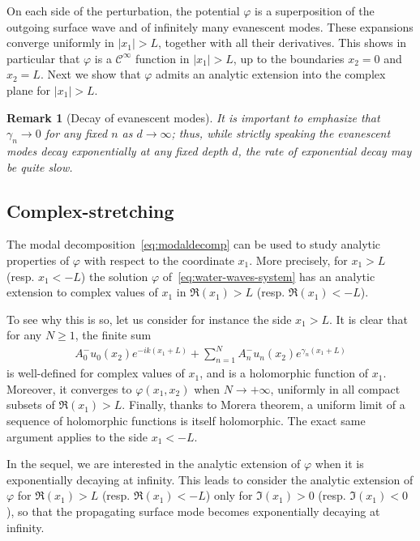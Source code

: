 \documentclass[11pt]{article}
\newtheorem{remark}[theorem]{Remark}
\begin{document}
On each side of the perturbation, the potential $\varphi$ is a superposition of
the outgoing surface wave and of infinitely many evanescent modes. These
expansions converge uniformly in $|x_1|>L$, together with all their derivatives.
This shows in particular that $\varphi$ is a $\mathcal{C}^\infty$ function in
$|x_1|>L$, up to the boundaries $x_2=0$ and $x_2=L$. Next we show that $\varphi$
admits an analytic extension into the complex plane for $|x_1|>L$.

\begin{remark}[Decay of evanescent modes]
  It is important to emphasize that $\gamma_n \to 0$ for any fixed $n$ as $d \to
  \infty$; thus, while strictly speaking the evanescent modes decay
  exponentially at any fixed depth $d$, the rate of exponential decay may be
  quite slow. 
\end{remark}

\subsection{Complex-stretching}\label{sec:complex-stretching}

The modal decomposition~\cref{eq:modaldecomp} can be used to study analytic
properties of $\varphi$ with respect to the coordinate $x_1$. More precisely,
for $x_1>L$ (resp. $x_1<-L$) the solution $\varphi$
of~\cref{eq:water-waves-system} has an analytic extension to complex values of
$x_1$ in $\Re(x_1)>L$ (resp. $\Re(x_1)<-L$). 

To see why this is so, let us consider for instance the side $x_1>L$. It is
clear that for any $N \geq 1$, the finite sum
\begin{align}
  A_0^-u_0(x_2)e^{-ik(x_1+L)}+\sum_{n= 1}^NA_n^-u_n(x_2)e^{\gamma_n(x_1+L)}
\end{align}
is well-defined for complex values of $x_1$, and is a holomorphic function of
$x_1$. Moreover, it converges to $\varphi(x_1,x_2)$ when $N\to +\infty$,
uniformly in all compact subsets of $\Re(x_1)>L$.  Finally, thanks to Morera
theorem, a uniform limit of a sequence of holomorphic functions is itself
holomorphic. The exact same argument applies to the side $x_1<-L$.

In the sequel, we are interested in the analytic extension of $\varphi$ when it
is exponentially decaying at infinity. This leads to consider the analytic
extension of $\varphi$ for $\Re(x_1)>L$  (resp. $\Re(x_1)<-L$) only for
$\Im(x_1)>0$ (resp. $\Im(x_1)<0$), so that the propagating surface mode becomes
exponentially decaying at infinity.
\end{document}
